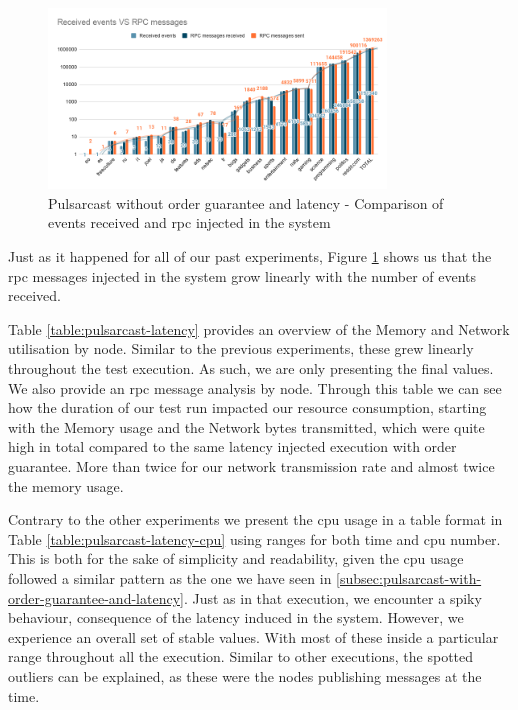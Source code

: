 \begin{figure}[!htb]
  \centering
  \includegraphics[width=0.8\textwidth]{img/graph-pulsarcast-latency-rpc.png}
  \caption{Pulsarcast without order guarantee and latency - Comparison of events received and \acrshort{rpc} injected in the system}
  \label{fig:graph-pulsarcast-latency-rpc}
\end{figure}

Just as it happened for all of our past experiments, Figure
\ref{fig:graph-pulsarcast-latency-rpc} shows us that the \acrshort{rpc}
messages injected in the system grow linearly with the number of events
received.

Table \ref{table:pulsarcast-latency} provides an overview of the Memory and
Network utilisation by node. Similar to the previous experiments, these grew
linearly throughout the test execution. As such, we are only presenting the
final values. We also provide an \acrshort{rpc} message analysis by node. Through this
table we can see how the duration of our test run impacted our resource
consumption, starting with the Memory usage and the Network bytes transmitted,
which were quite high in total compared to the same latency injected execution
with order guarantee. More than twice for our network transmission rate and
almost twice the memory usage.

Contrary to the other experiments we present the \acrshort{cpu} usage in a
table format in Table \ref{table:pulsarcast-latency-cpu} using ranges for both
time and \acrshort{cpu} number.  This is both for the sake of simplicity and
readability, given the \acrshort{cpu} usage followed a similar pattern as the
one we have seen in \ref{subsec:pulsarcast-with-order-guarantee-and-latency}.
Just as in that execution, we encounter a spiky behaviour, consequence of the
latency induced in the system. However, we experience an overall set of stable
values. With most of these inside a particular range throughout all the
execution. Similar to other executions, the spotted outliers can be explained,
as these were the nodes publishing messages at the time.

